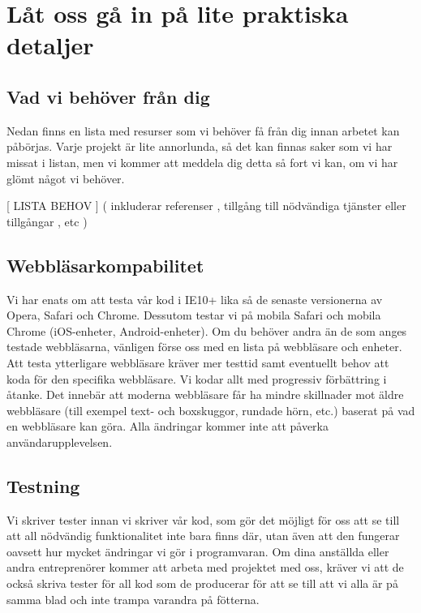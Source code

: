 \documentclass[10pt,a4paper,parskip]{scrartcl}
\begin{document}
\section{Låt oss gå in på lite praktiska detaljer}

\subsection{Vad vi behöver från dig}

Nedan finns en lista med resurser som vi behöver få från dig innan arbetet
kan påbörjas. Varje projekt är lite annorlunda, så det kan finnas
saker som vi har missat i listan, men vi kommer att meddela dig detta så fort
vi kan, om vi har glömt något vi behöver.

[ LISTA BEHOV ] ( inkluderar referenser , tillgång till nödvändiga tjänster
eller tillgångar , etc )

\subsection{Webbläsarkompabilitet}

Vi har enats om att testa vår kod i IE10+ lika så de senaste versionerna av
Opera, Safari och Chrome. Dessutom testar vi på mobila Safari och mobila Chrome
(iOS-enheter, Android-enheter). Om du behöver andra än de som anges testade
webbläsarna, vänligen förse oss med en lista på webbläsare och enheter. Att
testa ytterligare webbläsare kräver mer testtid samt eventuellt behov att koda
för den specifika webbläsare. Vi kodar allt med progressiv förbättring i
åtanke. Det innebär att moderna webbläsare får ha mindre skillnader mot äldre
webbläsare (till exempel text- och boxskuggor, rundade hörn, etc.) baserat på
vad en webbläsare kan göra. Alla ändringar kommer inte att påverka
användarupplevelsen.

\subsection{Testning}

Vi skriver tester innan vi skriver vår kod, som gör det möjligt för oss att se
till att all nödvändig funktionalitet inte bara finns där, utan även att den
fungerar oavsett hur mycket ändringar vi gör i programvaran. Om dina anställda
eller andra entreprenörer kommer att arbeta med projektet med oss,
kräver vi att de också skriva tester för all kod som de producerar för att se
till att vi alla är på samma blad och inte trampa varandra på fötterna.
\end{document}
